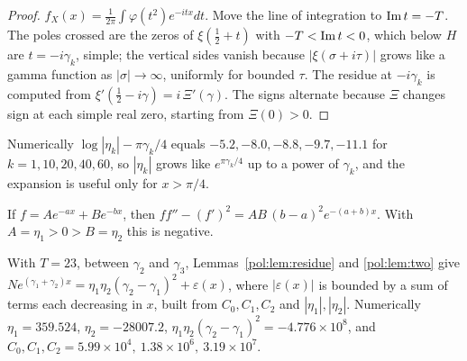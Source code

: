 \begin{proof}
$f_X(x)=\frac1{2\pi}\int\varphi(t^2)e^{-itx}dt$. Move the line of integration to $\operatorname{Im} t=-T$. The poles crossed are the zeros of $\xi(\frac12+t)$ with $-T<\operatorname{Im} t<0$, which below $H$ are $t=-i\gamma_k$, simple; the vertical sides vanish because $|\xi(\sigma+i\tau)|$ grows like a gamma function as $|\sigma|\to\infty$, uniformly for bounded $\tau$. The residue at $-i\gamma_k$ is computed from $\xi'(\frac12-i\gamma)=i\,\Xi'(\gamma)$. The signs alternate because $\Xi$ changes sign at each simple real zero, starting from $\Xi(0)>0$.
\end{proof}

Numerically $\log|\eta_k|-\pi\gamma_k/4$ equals $-5.2,-8.0,-8.8,-9.7,-11.1$ for $k=1,10,20,40,60$, so $|\eta_k|$ grows like $e^{\pi\gamma_k/4}$ up to a power of $\gamma_k$, and the expansion is useful only for $x>\pi/4$.

\begin{lemma}\label{pol:lem:two}
If $f=Ae^{-ax}+Be^{-bx}$, then $ff''-(f')^2=AB\,(b-a)^2e^{-(a+b)x}$. With $A=\eta_1>0>B=\eta_2$ this is negative.
\end{lemma}

With $T=23$, between $\gamma_2$ and $\gamma_3$, Lemmas~\ref{pol:lem:residue} and \ref{pol:lem:two} give $Ne^{(\gamma_1+\gamma_2)x}=\eta_1\eta_2(\gamma_2-\gamma_1)^2+\varepsilon(x)$, where $|\varepsilon(x)|$ is bounded by a sum of terms each decreasing in $x$, built from $C_0,C_1,C_2$ and $|\eta_1|,|\eta_2|$. Numerically $\eta_1=359.524$, $\eta_2=-28007.2$, $\eta_1\eta_2(\gamma_2-\gamma_1)^2=-4.776\times10^{8}$, and $C_0,C_1,C_2=5.99\times10^4,\ 1.38\times10^6,\ 3.19\times10^7$.

